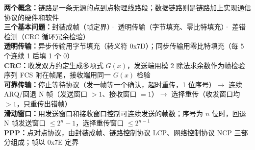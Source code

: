 \documentclass[a4paper,11pt]{article}
\begin{document}

\begin{knowmap}
\textbf{两个概念：}链路是一条无源的点到点物理线路段；数据链路则是链路加上实现通信协议的硬件和软件\\[2pt]
\textbf{三个基本问题：}封装成帧（帧定界）· 透明传输（字节填充、零比特填充）· 差错检测（CRC 循环冗余检验）\\[2pt]
\textbf{透明传输：}异步传输用字节填充（转义符 0x7D）；同步传输用零比特填充（每 5 个连续 1 后填 1 个 0）\\[2pt]
\textbf{CRC：}收发双方约定生成多项式 $G(x)$，发送端用模 2 除法求余数作为帧检验序列 FCS 附在帧尾，接收端用同一 $G(x)$ 检验\\[2pt]
\textbf{可靠传输：}停止等待协议（发一帧等一个确认，超时重传，1 位序号）$\rightarrow$ 连续 ARQ/回退 N 帧（发送窗口 $>1$、接收窗口 $=1$）$\rightarrow$ 选择重传（收发窗口均 $>1$，只重传出错帧）\\[2pt]
\textbf{滑动窗口：}用发送窗口和接收窗口控制可连续发送的帧数；序号为 $n$ 位时，回退 N 帧发送窗口 $\leq 2^n-1$，选择重传窗口 $\leq 2^{n-1}$\\[2pt]
\textbf{PPP：}点对点协议，由封装成帧、链路控制协议 LCP、网络控制协议 NCP 三部分组成；帧以 0x7E 定界
\end{knowmap}
\end{document}
